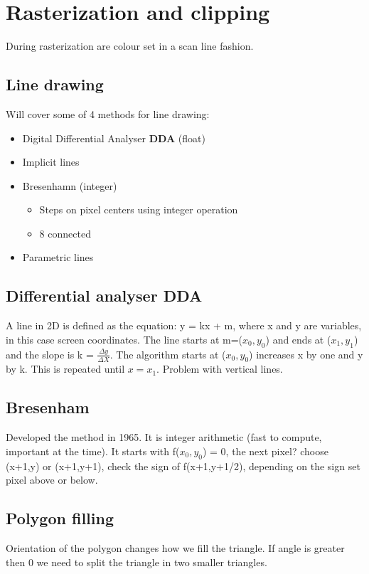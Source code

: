 \section{Rasterization and clipping}
During rasterization are colour set in a scan line fashion.

	\subsection*{Line drawing}
	Will cover some of 4 methods for line drawing:

		\begin{itemize}
			\item Digital Differential Analyser \textbf{DDA} (float)
			\item Implicit lines
			\item Bresenhamn (integer)
			\begin{itemize}
				\item Steps on pixel centers using integer operation
				\item 8 connected
			\end{itemize}
			\item Parametric lines
		\end{itemize}

	\subsection*{Differential analyser DDA}
	A line in 2D is defined as the equation: y = kx + m, where x and y are variables, in this case screen coordinates. The line starts at m=($x_0,y_0$) and ends at ($x_1, y_1$) and the slope is k = $\frac{\Delta y} {\Delta X} $. The algorithm starts at ($x_0,y_0$) increases x by one and y by k. This is repeated until $x=x_1$. Problem with vertical lines. 

	\subsection*{Bresenham}
	Developed the method in 1965. It is integer arithmetic (fast to compute, important at the time). It starts with f($x_0,y_0$) = 0, the next pixel? choose (x+1,y) or (x+1,y+1), check the sign of f(x+1,y+1/2), depending on the sign set pixel above or below. 

	\subsection*{Polygon filling}
	Orientation of the polygon changes how we fill the triangle. If angle is greater then 0 we need to split the triangle in two smaller triangles.


